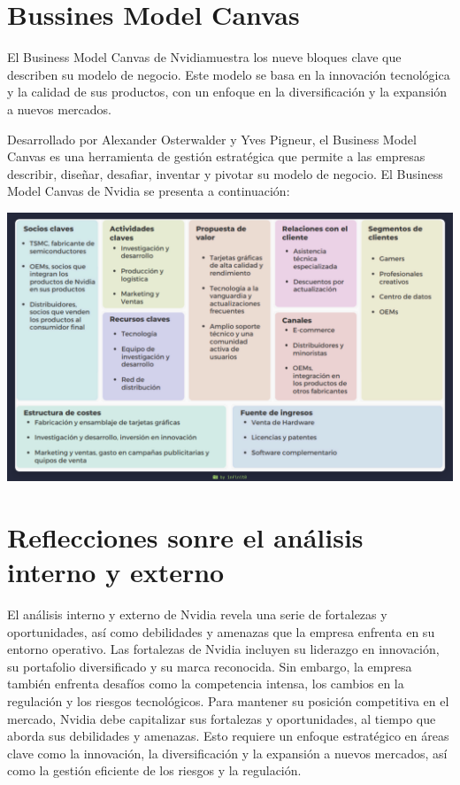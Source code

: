 \documentclass{article}
\begin{document}
\section{Bussines Model Canvas}

El Business Model Canvas de Nvidiamuestra los nueve bloques clave que describen su modelo de negocio. Este modelo se basa en la innovación tecnológica y la calidad de sus productos, con un enfoque en la diversificación y la expansión a nuevos mercados.

Desarrollado por Alexander Osterwalder y Yves Pigneur, el Business Model Canvas es una herramienta de gestión estratégica que permite a las empresas describir, diseñar, desafiar, inventar y pivotar su modelo de negocio. El Business Model Canvas de Nvidia se presenta a continuación:

\begin{center}
  \includegraphics[width=15cm]{./assets/canva.png}
\end{center}

\section{Reflecciones sonre el análisis interno y externo}

El análisis interno y externo de Nvidia revela una serie de fortalezas y oportunidades, así como debilidades y amenazas que la empresa enfrenta en su entorno operativo. Las fortalezas de Nvidia incluyen su liderazgo en innovación, su portafolio diversificado y su marca reconocida. Sin embargo, la empresa también enfrenta desafíos como la competencia intensa, los cambios en la regulación y los riesgos tecnológicos. Para mantener su posición competitiva en el mercado, Nvidia debe capitalizar sus fortalezas y oportunidades, al tiempo que aborda sus debilidades y amenazas. Esto requiere un enfoque estratégico en áreas clave como la innovación, la diversificación y la expansión a nuevos mercados, así como la gestión eficiente de los riesgos y la regulación.
\end{document}

